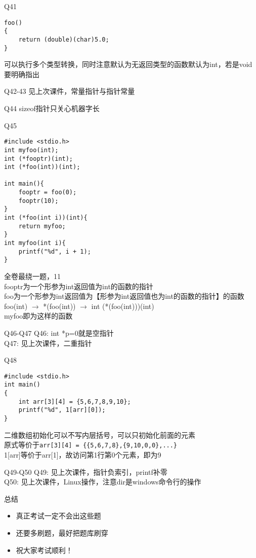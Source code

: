 \documentclass[UTF8]{ctexbeamer}
\newcommand{\fontsm}{\fontsize{8}{9.2}\selectfont}
\begin{document}
\begin{frame}[fragile]{Q41}
\begin{lstlisting}
foo()
{
    return (double)(char)5.0;
}
\end{lstlisting}
可以执行多个类型转换，同时注意默认为无返回类型的函数默认为int，若是void要明确指出
\end{frame}

\begin{frame}{Q42-43}
见上次课件，常量指针与指针常量
\end{frame}

\begin{frame}{Q44}
sizeof指针只关心机器字长
\end{frame}

\begin{frame}[fragile]{Q45}
\fontsm
\begin{lstlisting}
#include <stdio.h>
int myfoo(int);
int (*fooptr)(int);
int (*foo(int))(int);

int main(){
    fooptr = foo(0);
    fooptr(10);
}
int (*foo(int i))(int){
    return myfoo;
}
int myfoo(int i){
    printf("%d", i + 1);
}
\end{lstlisting}
全卷最绕一题，11\\
fooptr为一个形参为int返回值为int的函数的指针\\
foo为一个形参为int返回值为【形参为int返回值也为int的函数的指针】的函数\\
foo(int) $\to$ *(foo(int)) $\to$ int (*(foo(int)))(int)\\
myfoo即为这样的函数
\end{frame}

\begin{frame}{Q46-Q47}
Q46: int *p=0就是空指针\\
Q47: 见上次课件，二重指针
\end{frame}

\begin{frame}[fragile]{Q48}
\begin{lstlisting}
#include <stdio.h>
int main()
{
    int arr[3][4] = {5,6,7,8,9,10};
    printf("%d", 1[arr][0]);
}
\end{lstlisting}
二维数组初始化可以不写内层括号，可以只初始化前面的元素\\
原式等价于\verb'arr[3][4] = {{5,6,7,8},{9,10,0,0},...}'\\
1[arr]等价于arr[1]，故访问第1行第0个元素，即为9
\end{frame}

\begin{frame}{Q49-Q50}
Q49: 见上次课件，指针负索引，printf补零\\
Q50: 见上次课件，Linux操作，注意dir是windows命令行的操作
\end{frame}

\begin{frame}{总结}
\begin{itemize}[<+->]
	\item 真正考试一定不会出这些题
	\item 还要多刷题，最好把题库刷穿
	\item 祝大家考试顺利！
\end{itemize}
\end{frame}
\end{document}
